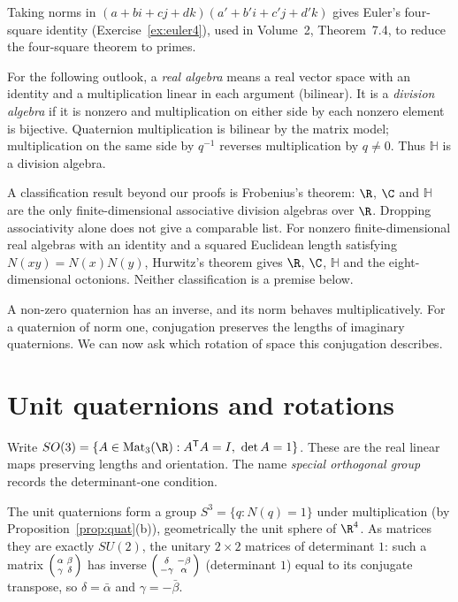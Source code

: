 Taking norms in $(a+bi+cj+dk)(a'+b'i+c'j+d'k)$ gives Euler's four-square identity (Exercise~\ref{ex:euler4}), used in Volume~2, Theorem~7.4, to reduce the four-square theorem to primes.

For the following outlook, a \emph{real algebra} means a real vector space
with an identity and a multiplication linear in each argument (bilinear).
It is a \emph{division algebra}
if it is nonzero and multiplication on either side by each nonzero element
is bijective. Quaternion multiplication is bilinear by the matrix model;
multiplication on the same side by $q^{-1}$ reverses multiplication by
$q\ne0$. Thus $\mathbb H$ is a division algebra.

A classification result beyond our proofs is Frobenius's theorem: $\R$, $\C$ and $\mathbb H$ are the only finite-dimensional associative division algebras over $\R$. Dropping associativity alone does not give a comparable list. For nonzero finite-dimensional real algebras with an identity and a squared Euclidean length satisfying $N(xy)=N(x)N(y)$, Hurwitz's theorem gives $\R$, $\C$, $\mathbb H$ and the eight-dimensional octonions. Neither classification is a premise below.

A non-zero quaternion has an inverse, and its norm behaves multiplicatively. For a quaternion of norm one, conjugation preserves the lengths of imaginary quaternions. We can now ask which rotation of space this conjugation describes.

\section{Unit quaternions and rotations}

Write $SO(3)=\{A\in\operatorname{Mat}_3(\R):A^{\mathsf T}A=I,\ \det A=1\}$.
These are the real linear maps preserving lengths and orientation. The name
\emph{special orthogonal group} records the determinant-one condition.

The unit quaternions form a group $S^3=\{q:N(q)=1\}$ under multiplication (by Proposition~\ref{prop:quat}(b)), geometrically the unit sphere of $\R^4$. As matrices they are exactly $SU(2)$, the unitary $2\times2$ matrices of determinant $1$: such a matrix $\begin{psmallmatrix}\alpha&\beta\\\gamma&\delta\end{psmallmatrix}$ has inverse $\begin{psmallmatrix}\delta&-\beta\\-\gamma&\alpha\end{psmallmatrix}$ (determinant $1$) equal to its conjugate transpose, so $\delta=\bar\alpha$ and $\gamma=-\bar\beta$.

